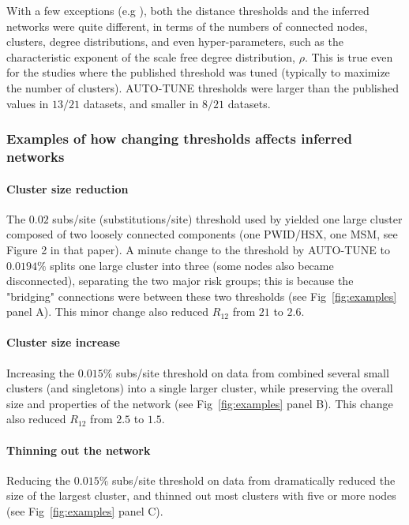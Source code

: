 \documentclass[utf8]{FrontiersinHarvard} %
\begin{document}
With a few exceptions (e.g \cite{dalai_combining_2018,sivay_hiv-1_2018}), both
the distance thresholds and the inferred networks were quite different, in
terms of the numbers of connected nodes, clusters, degree distributions, and
even hyper-parameters, such as the characteristic exponent of the scale free
degree distribution, $\rho$. This is true even for the studies where the
published threshold was tuned (typically to maximize the number of clusters).
AUTO-TUNE thresholds were larger than the published values in $13/21$ datasets,
and smaller in $8/21$ datasets.

\subsubsection{Examples of how changing thresholds affects inferred networks}

\paragraph{Cluster size reduction} The $0.02$ subs/site (substitutions/site)
threshold used by \citet{dalai_combining_2018} yielded one large cluster
composed of two loosely connected components (one PWID/HSX, one MSM, see Figure
2 in that paper). A minute change to the threshold by AUTO-TUNE to $0.0194\%$
splits one large cluster into three (some nodes also became disconnected),
separating the two major risk groups; this is because the "bridging"
connections were between these two thresholds (see Fig~\ref{fig:examples} panel
A). This minor change also reduced $R_{12}$ from $21$ to $2.6$.

\paragraph{Cluster size increase}  Increasing the $0.015\%$ subs/site threshold on data from \citet{Little:2014aa} combined
several small clusters (and singletons) into a single larger cluster, while
preserving the overall size and properties of the network (see
Fig~\ref{fig:examples} panel B). This change also reduced $R_{12}$ from $2.5$
to $1.5$.

\paragraph{Thinning out the network}  Reducing the $0.015\%$ subs/site threshold on data from \citet{rhee_national_2019}
dramatically reduced the size of the largest cluster, and thinned out most
clusters with five or more nodes (see Fig~\ref{fig:examples} panel C).
\end{document}
